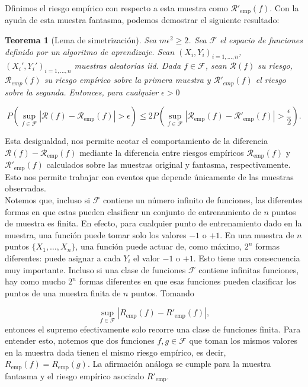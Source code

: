 \documentclass{article}
\newtheorem{thm}{Teorema}[subsection]
\begin{document}
Dfinimos el riesgo empírico con respecto a esta muestra como \(\mathcal{R}'_{\text{emp}}(f)\). 
Con la ayuda de esta muestra fantasma, podemos demostrar el siguiente resultado:

\begin{thm}[Lema de simetrización]

Sea $m\epsilon^2 \geq 2$. Sea $\mathcal{F}$ el espacio de funciones definido por un algoritmo de aprendizaje. Sean
$(X_i,Y_i)_{i=1,\dots, n}$, $(X_i',Y_i')_{i=1,\dots, n}$ muestras aleatorias iid. Dada $f \in\mathcal{F}$,
sean $\mathcal{R}(f)$ su riesgo, $\mathcal{R}_{emp}(f)$ su riesgo empírico sobre la primera muestra y 
$\mathcal{R}'_{emp}(f)$ el riesgo sobre la segunda. Entonces, para cualquier $\epsilon > 0$

\[
P\left(\sup_{f \in \mathcal{F}} |\mathcal{R}(f) - \mathcal{R}_{\text{emp}}(f)| > 
\epsilon \right) \leq 2P\left(\sup_{f \in \mathcal{F}} |\mathcal{R}_{\text{emp}}(f) - \mathcal{R}'_{\text{emp}}(f)| > \frac{\epsilon}{2}\right).
\]
\end{thm}

Esta desigualdad, nos permite acotar el comportamiento 
de la diferencia \(\mathcal{R}(f) - \mathcal{R}_{\text{emp}}(f)\) mediante la diferencia entre riesgos empíricos \(\mathcal{R}_{\text{emp}}(f)\) y 
\(\mathcal{R}'_{\text{emp}}(f)\) calculados sobre las muestras original y fantasma, respectivamente. Esto nos permite trabajar 
con eventos que depende únicamente de las muestras observadas.\\

Notemos que, incluso si \(\mathcal{F}\) contiene un número infinito de funciones, 
las diferentes formas en que estas pueden clasificar un conjunto de entrenamiento de \(n\) puntos de muestra 
es finita. En efecto, para cualquier punto de entrenamiento dado en la muestra, una función puede tomar solo los valores 
\(-1\) o \(+1\). En una muestra de \(n\) puntos \(\{X_1, \dots, X_n\}\), una función puede actuar de, como 
máximo, \(2^n\) formas diferentes: puede asignar a cada \(Y_i\) el valor \(-1\) o \(+1\). Esto tiene una 
consecuencia muy importante. Incluso si una clase de funciones \(\mathcal{F}\) contiene infinitas funciones, hay como 
mucho \(2^n\) formas diferentes en que esas funciones pueden clasificar los puntos de una muestra finita de 
\(n\) puntos. Tomando

\[
\sup_{f \in \mathcal{F}} |R_{\text{emp}}(f) - R'_{\text{emp}}(f)|,
\]
entonces el supremo efectivamente solo recorre una clase de funciones finita. Para entender esto, notemos que 
dos funciones \(f, g \in \mathcal{F}\) que toman los mismos valores en la muestra dada tienen el mismo riesgo empírico, 
es decir, \(R_{\text{emp}}(f) = R_{\text{emp}}(g)\). La afirmación análoga se cumple para la muestra fantasma 
y el riesgo empírico asociado \(R'_{\text{emp}}\). \\
\end{document}
